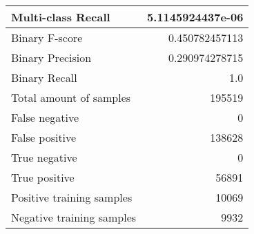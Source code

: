 \begin{table}[H]
\begin{minipage}{0.5\textwidth}
\begin{tabular}{l r}
Multi-class Recall & 5.1145924437e-06 \\
\midrule
Binary F-score & 0.450782457113 \\
Binary Precision & 0.290974278715 \\
Binary Recall & 1.0 \\
\midrule
Total amount of samples & 195519 \\
False negative & 0 \\
False positive & 138628 \\
True negative & 0 \\
True positive & 56891 \\
\midrule
Positive training samples & 10069 \\
Negative training samples & 9932 \\
\bottomrule
\end{tabular}
\end{minipage}
\end{table}
